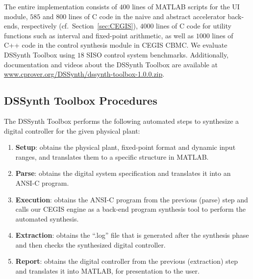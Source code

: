 \documentclass[10pt,conference]{IEEEtran}
\newcommand\tool{{DSSynth Toolbox}\xspace}
\begin{document}
The entire implementation consists of $400$ lines of MATLAB scripts for the
UI module, $585$ and $800$ lines of C code in the naive and abstract
accelerator back-ends, respectively (cf.~Section~\ref{sec:CEGIS}), $4000$
lines of C code for utility functions such as interval and fixed-point
arithmetic, as well as $1000$ lines of C++ code in the control synthesis
module in CEGIS CBMC.  We evaluate \tool using $18$ SISO control system
benchmarks.  Additionally, documentation and videos about the \tool are
available at \url{www.cprover.org/DSSynth/dssynth-toolbox-1.0.0.zip}.


\subsection{\tool Procedures}

The \tool performs the following automated steps
to synthesize a digital controller for the given physical plant:
%
\begin{enumerate}
%
\item \textbf{Setup}: obtains the physical plant, fixed-point format and
dynamic input ranges, and translates them to a specific structure in MATLAB.
%
\item \textbf{Parse}: obtains the digital system specification and translates 
it into an ANSI-C program.
%
\item \textbf{Execution}: obtains the ANSI-C program from the previous
(parse) step and calls our CEGIS engine as a back-end program synthesis tool
to perform the automated synthesis.
%
\item \textbf{Extraction}: obtains the ``.log'' file that is generated 
after the synthesis phase and then checks the synthesized digital controller.
%
\item \textbf{Report}: obtains the digital controller from the previous
(extraction) step and translates it into MATLAB, for presentation to the
user.
%
\end{enumerate}

\end{document}
